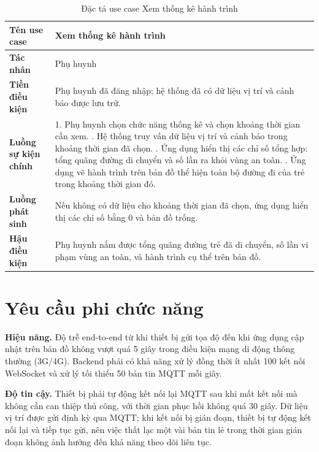 \documentclass[../DoAn.tex]{subfiles}
\begin{document}
\begin{table}[H]
\centering
\caption{Đặc tả use case Xem thống kê hành trình}
\label{table:uc_stats}
\begin{tabular}{|l|p{9.5cm}|}
\hline
\textbf{Tên use case}       & Xem thống kê hành trình \\
\hline
\textbf{Tác nhân}           & Phụ huynh \\
\hline
\textbf{Tiền điều kiện}     & Phụ huynh đã đăng nhập; hệ thống đã có dữ liệu vị trí và cảnh báo được lưu trữ. \\
\hline
\textbf{Luồng sự kiện chính} &
1. Phụ huynh chọn chức năng thống kê và chọn khoảng thời gian cần xem. \newline
2. Hệ thống truy vấn dữ liệu vị trí và cảnh báo trong khoảng thời gian đã chọn. \newline
3. Ứng dụng hiển thị các chỉ số tổng hợp: tổng quãng đường di chuyển và số lần ra khỏi vùng an toàn. \newline
4. Ứng dụng vẽ hành trình trên bản đồ thể hiện toàn bộ đường đi của trẻ trong khoảng thời gian đó. \\
\hline
\textbf{Luồng phát sinh}    & Nếu không có dữ liệu cho khoảng thời gian đã chọn, ứng dụng hiển thị các chỉ số bằng 0 và bản đồ trống. \\
\hline
\textbf{Hậu điều kiện}      & Phụ huynh nắm được tổng quãng đường trẻ đã di chuyển, số lần vi phạm vùng an toàn, và hành trình cụ thể trên bản đồ. \\
\hline
\end{tabular}
\end{table}

\section{Yêu cầu phi chức năng}
\label{section:2.4}

\textbf{Hiệu năng.} Độ trễ end-to-end từ khi thiết bị gửi tọa độ đến khi ứng dụng cập nhật trên bản đồ không vượt quá 5 giây trong điều kiện mạng di động thông thường (3G/4G). Backend phải có khả năng xử lý đồng thời ít nhất 100 kết nối WebSocket và xử lý tối thiểu 50 bản tin MQTT mỗi giây.

\textbf{Độ tin cậy.} Thiết bị phải tự động kết nối lại MQTT sau khi mất kết nối mà không cần can thiệp thủ công, với thời gian phục hồi không quá 30 giây. Dữ liệu vị trí được gửi định kỳ qua MQTT; khi kết nối bị gián đoạn, thiết bị tự động kết nối lại và tiếp tục gửi, nên việc thất lạc một vài bản tin lẻ trong thời gian gián đoạn không ảnh hưởng đến khả năng theo dõi liên tục.
\end{document}
